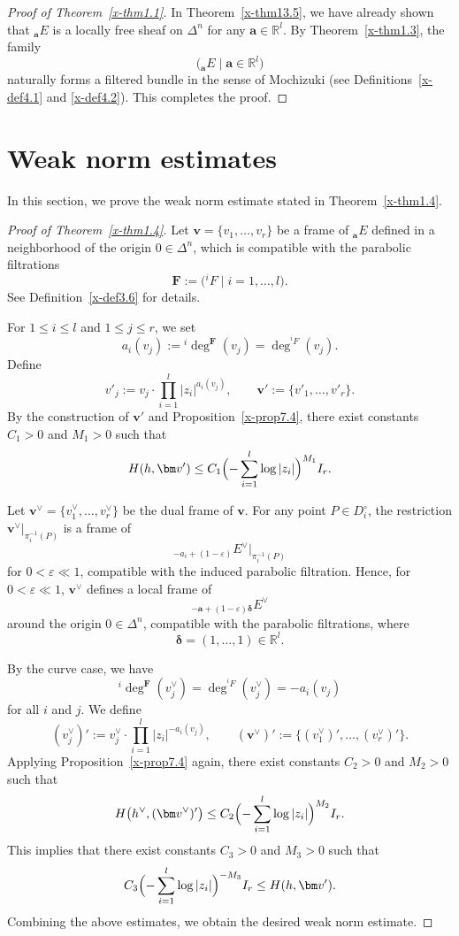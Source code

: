 \documentclass[12pt,twoside]{amsart}
\theoremstyle{definition}
\begin{document}
\begin{proof}[Proof of Theorem~\ref{x-thm1.1}]
In Theorem~\ref{x-thm13.5}, we have already shown that
${}_{\bm a}E$ is a locally free sheaf on $\Delta^n$
for any $\bm a\in\mathbb R^l$.
By Theorem~\ref{x-thm1.3}, the family
\[
\bigl({}_{\bm a}E \mid \bm a\in\mathbb R^l\bigr)
\]
naturally forms a filtered bundle in the sense of Mochizuki
(see Definitions~\ref{x-def4.1} and \ref{x-def4.2}).
This completes the proof.
\end{proof}

\section{Weak norm estimates}\label{x-sec14}

In this section, we prove the weak norm estimate stated in
Theorem~\ref{x-thm1.4}.

\begin{proof}[Proof of Theorem~\ref{x-thm1.4}]
Let $\bm v=\{v_1,\ldots,v_r\}$ be a frame of ${}_{\bm a}E$
defined in a neighborhood of the origin $0\in\Delta^n$,
which is compatible with the parabolic filtrations
\[
\mathbf F:=\bigl({}^i\!F \mid i=1,\ldots,l\bigr).
\]
See Definition~\ref{x-def3.6} for details.

For $1\le i\le l$ and $1\le j\le r$, we set
\[
a_i(v_j):={}^i\!\deg^{\mathbf F}(v_j)
=\deg^{{}^i\!F}(v_j).
\]
Define
\[
v'_j:=v_j\cdot\prod_{i=1}^l |z_i|^{a_i(v_j)},
\qquad
\bm v':=\{v'_1,\ldots,v'_r\}.
\]
By the construction of $\bm v'$ and Proposition~\ref{x-prop7.4},
there exist constants $C_1>0$ and $M_1>0$ such that
\[
H(h,\bm v')
\le
C_1\Bigl(-\sum_{i=1}^l\log|z_i|\Bigr)^{M_1} I_r.
\]

Let $\bm v^\vee=\{v_1^\vee,\ldots,v_r^\vee\}$ be the dual frame of $\bm v$.
For any point $P\in D_i^\circ$,
the restriction $\bm v^\vee|_{\pi_i^{-1}(P)}$ is a frame of
\[
{}_{-a_i+(1-\varepsilon)}E^\vee\big|_{\pi_i^{-1}(P)}
\]
for $0<\varepsilon\ll1$, compatible with the induced parabolic filtration.
Hence, for $0<\varepsilon\ll1$,
$\bm v^\vee$ defines a local frame of
\[
{}_{-\bm a+(1-\varepsilon)\bm\delta}E^\vee
\]
around the origin $0\in\Delta^n$,
compatible with the parabolic filtrations,
where
\[
\bm\delta=(1,\ldots,1)\in\mathbb R^l.
\]

By the curve case, we have
\[
{}^i\!\deg^{\mathbf F}(v_j^\vee)
=\deg^{{}^i\!F}(v_j^\vee)
=-a_i(v_j)
\]
for all $i$ and $j$.
We define
\[
(v_j^\vee)':=
v_j^\vee\cdot\prod_{i=1}^l |z_i|^{-a_i(v_j)},
\qquad
(\bm v^\vee)':=\{(v_1^\vee)',\ldots,(v_r^\vee)'\}.
\]
Applying Proposition~\ref{x-prop7.4} again,
there exist constants $C_2>0$ and $M_2>0$ such that
\[
H\bigl(h^\vee,(\bm v^\vee)'\bigr)
\le
C_2\Bigl(-\sum_{i=1}^l\log|z_i|\Bigr)^{M_2} I_r.
\]
This implies that there exist constants $C_3>0$ and $M_3>0$ such that
\[
C_3\Bigl(-\sum_{i=1}^l\log|z_i|\Bigr)^{-M_3} I_r
\le
H(h,\bm v').
\]
Combining the above estimates, we obtain the desired weak norm estimate.
\end{proof}
\end{document}
